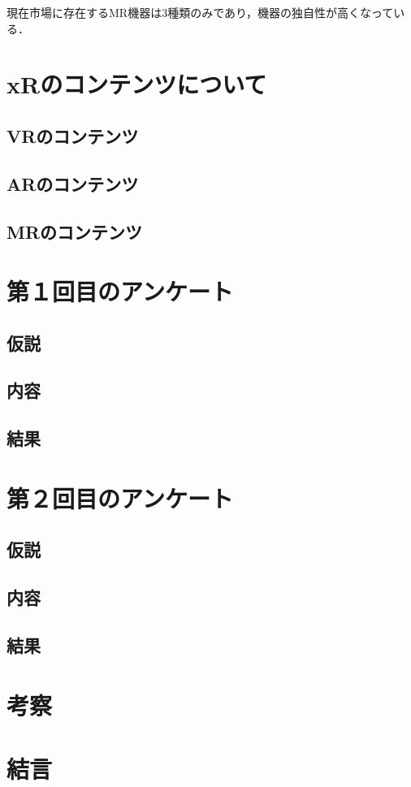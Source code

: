 \documentclass[12pt,a4j]{ltjsarticle}
\begin{document}
現在市場に存在するMR機器は3種類のみであり，機器の独自性が高くなっている．


\section{xRのコンテンツについて}
\subsection{VRのコンテンツ}
\subsection{ARのコンテンツ}
\subsection{MRのコンテンツ}
\section{第１回目のアンケート}
\subsection{仮説}
\subsection{内容}
\subsection{結果}
\section{第２回目のアンケート}
\subsection{仮説}
\subsection{内容}
\subsection{結果}
\section{考察}
\section{結言}
\end{document}
